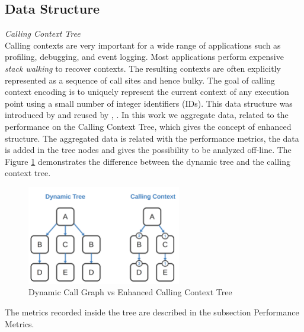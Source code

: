 \subsection{Data Structure}

\textit{Calling Context Tree}\\
Calling contexts are very important for a wide range of applications such as profiling, debugging, and event logging. Most applications perform expensive \textit{stack walking} to recover contexts\cite{precise}. The resulting contexts are often explicitly represented as a sequence of call sites and hence bulky. The goal of calling context encoding is to uniquely represent the current context of any execution point using a small number of integer identifiers (IDs). This data structure was introduced by \cite{27} and reused by \cite{4}, \cite{28}.
    In this work we aggregate data, related to the performance on the Calling Context Tree, which gives the concept of enhanced structure. The aggregated data is related with the performance metrics, the data is added in the tree nodes and gives the possibility to be analyzed off-line.
    The Figure \ref{fig:ecct_dt} demonstrates the difference between the dynamic tree and the calling context tree.
    \begin{figure}[h]
        \centering
        \includegraphics[width=0.60\textwidth]{figures/dynamic-calling.png}
        \caption{Dynamic Call Graph vs Enhanced Calling Context Tree }
        \label{fig:ecct_dt}
    \end{figure}
    The metrics recorded inside the tree are described in the subsection Performance Metrics.
    
